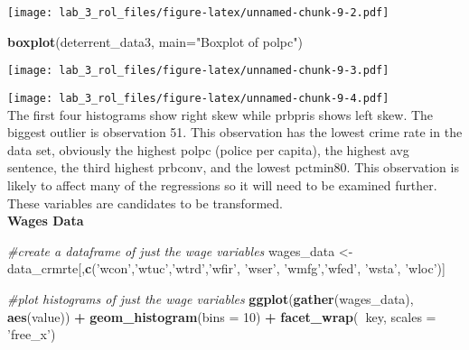 \documentclass[
]{article}
\newenvironment{Shaded}{\begin{snugshade}}{\end{snugshade}}
\newcommand{\CommentTok}[1]{\textcolor[rgb]{0.56,0.35,0.01}{\textit{#1}}}
\newcommand{\DataTypeTok}[1]{\textcolor[rgb]{0.13,0.29,0.53}{#1}}
\newcommand{\DecValTok}[1]{\textcolor[rgb]{0.00,0.00,0.81}{#1}}
\newcommand{\KeywordTok}[1]{\textcolor[rgb]{0.13,0.29,0.53}{\textbf{#1}}}
\newcommand{\NormalTok}[1]{#1}
\newcommand{\OperatorTok}[1]{\textcolor[rgb]{0.81,0.36,0.00}{\textbf{#1}}}
\newcommand{\StringTok}[1]{\textcolor[rgb]{0.31,0.60,0.02}{#1}}
\begin{document}
\texttt{[image: lab\_3\_rol\_files/figure-latex/unnamed-chunk-9-2.pdf]}

\begin{Shaded}
\begin{Highlighting}[]
\KeywordTok{boxplot}\NormalTok{(deterrent_data3, }\DataTypeTok{main=}\StringTok{"Boxplot of polpc"}\NormalTok{)}
\end{Highlighting}
\end{Shaded}

\texttt{[image: lab\_3\_rol\_files/figure-latex/unnamed-chunk-9-3.pdf]}

\begin{Shaded}
\end{Shaded}

\texttt{[image: lab\_3\_rol\_files/figure-latex/unnamed-chunk-9-4.pdf]}\\
The first four histograms show right skew while prbpris shows left skew.
The biggest outlier is observation 51. This observation has the lowest
crime rate in the data set, obviously the highest polpc (police per
capita), the highest avg sentence, the third highest prbconv, and the
lowest pctmin80. This observation is likely to affect many of the
regressions so it will need to be examined further. These variables are
candidates to be transformed.\\

\textbf{Wages Data}\\

\begin{Shaded}
\begin{Highlighting}[]
\CommentTok{#create a dataframe of just the wage variables}
\NormalTok{wages_data <-}\StringTok{ }\NormalTok{data_crmrte[,}\KeywordTok{c}\NormalTok{(}\StringTok{'wcon'}\NormalTok{,}\StringTok{'wtuc'}\NormalTok{,}\StringTok{'wtrd'}\NormalTok{,}\StringTok{'wfir'}\NormalTok{, }\StringTok{'wser'}\NormalTok{,}
                      \StringTok{'wmfg'}\NormalTok{,}\StringTok{'wfed'}\NormalTok{, }\StringTok{'wsta'}\NormalTok{, }\StringTok{'wloc'}\NormalTok{)]}

\CommentTok{#plot histograms of just the wage variables}
\KeywordTok{ggplot}\NormalTok{(}\KeywordTok{gather}\NormalTok{(wages_data), }\KeywordTok{aes}\NormalTok{(value)) }\OperatorTok{+}\StringTok{ }
\StringTok{  }\KeywordTok{geom_histogram}\NormalTok{(}\DataTypeTok{bins =} \DecValTok{10}\NormalTok{) }\OperatorTok{+}\StringTok{ }
\StringTok{  }\KeywordTok{facet_wrap}\NormalTok{(}\OperatorTok{~}\NormalTok{key, }\DataTypeTok{scales =} \StringTok{'free_x'}\NormalTok{)}
\end{Highlighting}
\end{Shaded}
\end{document}

